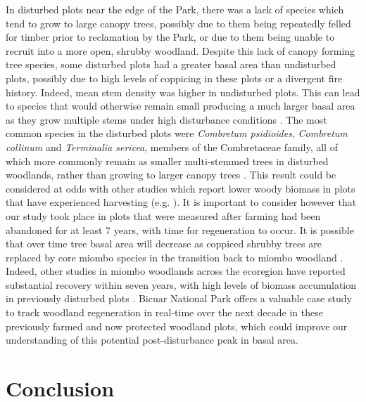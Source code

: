 \begin{refsection}
In disturbed plots near the edge of the Park, there was a lack of species which tend to grow to large canopy trees, possibly due to them being repeatedly felled for timber prior to reclamation by the Park, or due to them being unable to recruit into a more open, shrubby woodland. Despite this lack of canopy forming tree species, some disturbed plots had a greater basal area than undisturbed plots, possibly due to high levels of coppicing in these plots or a divergent fire history. Indeed, mean stem density was higher in undisturbed plots. This can lead to species that would otherwise remain small producing a much larger basal area as they grow multiple stems under high disturbance conditions \citep{Luoga2004}. The most common species in the disturbed plots were \textit{Combretum psidioides}, \textit{Combretum collinum} and \textit{Terminalia sericea}, members of the Combretaceae family, all of which more commonly remain as smaller multi-stemmed trees in disturbed woodlands, rather than growing to larger canopy trees \citep{Wyk2014}. This result could be considered at odds with other studies which report lower woody biomass in plots that have experienced harvesting (e.g. \citealt{Muvengwi2020}). It is important to consider however that our study took place in plots that were measured after farming had been abandoned for at least 7 years, with time for regeneration to occur. It is possible that over time tree basal area will decrease as coppiced shrubby trees are replaced by core miombo species in the transition back to miombo woodland \citep{Goncalves2017}. Indeed, other studies in miombo woodlands across the ecoregion have reported substantial recovery within seven years, with high levels of biomass accumulation in previously disturbed plots \citep{Chidumayo2013, Goncalves2017}. Bicuar National Park offers a valuable case study to track woodland regeneration in real-time over the next decade in these previously farmed and now protected woodland plots, which could improve our understanding of this potential post-disturbance peak in basal area.

\section{Conclusion}
\label{bicuar:sec:conclusion}


\end{refsection}
